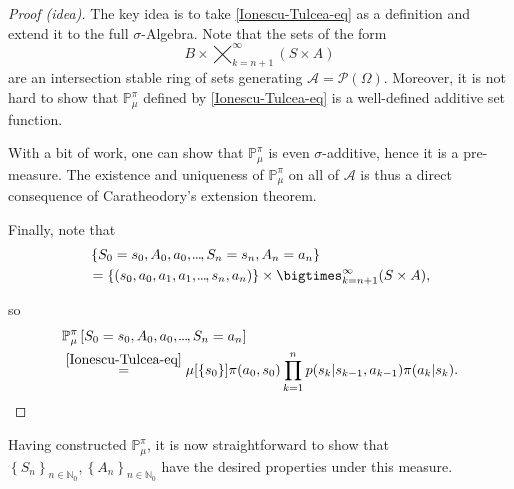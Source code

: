 \begin{proof}[Proof (idea)]
    The key idea is to take \eqref{Ionescu-Tulcea-eq} as a definition and extend it to the full \( \sigma \)-Algebra. Note that the sets of the form 
    \[
        B \times \bigtimes_{k=n+1}^{\infty} (S \times A) 
    \] 
    are an intersection stable ring of sets generating \( \mathcal{A} = \mathcal{P}(\Omega) \). Moreover, it is not hard to show that \( \mathbb{P}_\mu^\pi \) defined by \eqref{Ionescu-Tulcea-eq} is a well-defined additive set function.
    
    With a bit of work, one can show that \( \mathbb{P}_\mu^\pi \) is even \( \sigma \)-additive, hence it is a pre-measure. The existence and uniqueness of \( \mathbb{P}_\mu^\pi \) on all of \( \mathcal{A} \) is thus a direct consequence of Caratheodory's extension theorem.  
    
    Finally, note that 
    \begin{align*}
       &\left\{ S_{0}=s_{0}, A_{0},a_{0},\mydots,S_n = s_n, A_n = a_n \right\} \\
        &= \left\{ (s_{0},a_{0},a_{1},a_{1},\mydots,s_n,a_n) \right\} \times \bigtimes_{k=n+1}^{\infty}(S \times A),\\
    \end{align*}

    so 
    \begin{align*}
        &\mathbb{P}_\mu^\pi \left[ S_{0}=s_{0}, A_{0},a_{0},\kern-0.10em.\kern-0.06em.\kern-0.06em.\kern-0.1em,S_n = a_n  \right] \\
        &\overset{\eqref{Ionescu-Tulcea-eq}}{=} \mu[\left\{ s_{0} \right\}] \pi(a_{0},s_{0}) \prod_{k=1}^{n} p(s_k | s_{k-1}, a_{k-1}) \pi(a_{k}|s_{k}).
    \end{align*}
\end{proof}


Having constructed \( \mathbb{P}_\mu^\pi \), it is now straightforward to show that \( \left\{ S_n \right\}_{n \in \mathbb{N}_{0}}, \left\{ A_n \right\}_{n \in \mathbb{N}_{0}} \) have the desired properties under this measure.

